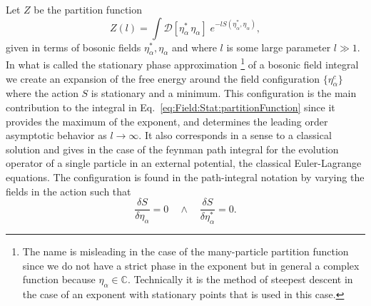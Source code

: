 Let $Z$ be the partition function
\begin{equation}
    \label{eq:Field:Stat:partitionFunction}
    Z(l) = \int\!\mathcal{D}[\eta^\ast_\alpha\,\eta_\alpha]\;e^{-lS(\eta^\ast_\alpha, \eta_\alpha)},
\end{equation}
given in terms of bosonic fields $\eta^\ast_\alpha, \eta_\alpha$ and where $l$ is some large parameter $l\gg 1$.
In what is called the stationary phase approximation%
%
\footnote{The name is misleading in the case of the many-particle partition function
since we do not have a strict phase in the exponent but in general a complex function because $\eta_\alpha\in\mathbb{C}$.
Technically it is the method of steepest descent in the case of an exponent with stationary points that is used in this
case.} %
%
of a bosonic field integral we create an expansion of the free energy around
the field configuration $\{\eta^c_\alpha\}$ where the action $S$ is stationary and a minimum. This configuration
is the main contribution to the integral in Eq.~\eqref{eq:Field:Stat:partitionFunction} since it provides the maximum of
the exponent,
and determines the leading order asymptotic behavior as $l\to\infty$. It also corresponds in a sense to a classical solution
and gives in the case of the feynman path integral for the evolution operator of a single particle in an external potential,
the classical Euler-Lagrange equations.
The configuration is found in the path-integral notation by varying the fields in the action such that
\begin{equation}
    \label{eq:Field:Stat:stationaryCondition}
    \frac{\delta S}{\delta \eta_\alpha} = 0\quad\land\quad
    \frac{\delta S}{\delta \eta_\alpha^\ast} = 0.
\end{equation}

